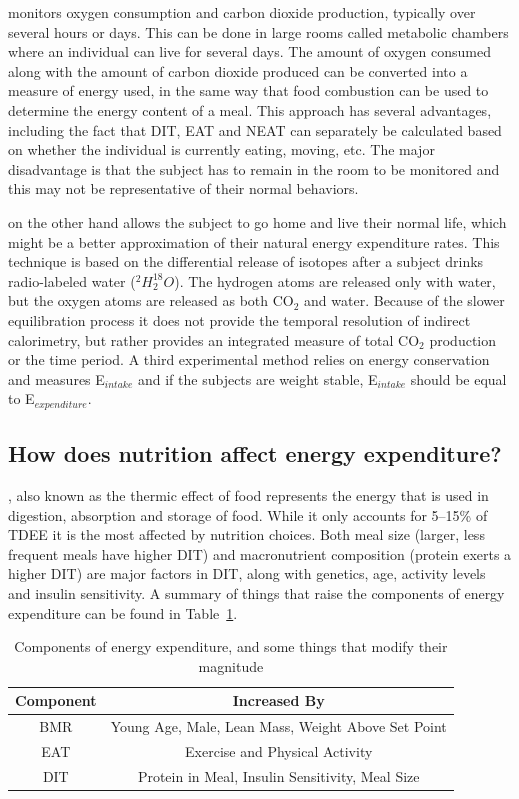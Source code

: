 \documentclass{tufte-handout}
\begin{document}
 monitors oxygen consumption and carbon dioxide production, typically over several hours or days.  This can be done in large rooms called metabolic chambers where an individual can live for several days.  The amount of oxygen consumed along with the amount of carbon dioxide produced can be converted into a measure of energy used, in the same way that food combustion can be used to determine the energy content of a meal.  This approach has several advantages, including the fact that DIT, EAT and NEAT can separately be calculated based on whether the individual is currently eating, moving, etc.  The major disadvantage is that the subject has to remain in the room to be monitored and this may not be representative of their normal behaviors.

 on the other hand allows the subject to go home and live their normal life, which might be a better approximation of their natural energy expenditure rates.  This technique is based on the differential release of isotopes after a subject drinks radio-labeled water ($^2H_2^{18}O$).  The hydrogen atoms are released only with water, but the oxygen atoms are released as both CO$_2$ and water.  Because of the slower equilibration process it does not provide the temporal resolution of indirect calorimetry, but rather provides an integrated measure of total CO$_2$ production or the time period.  A third experimental method relies on energy conservation and measures E$_{intake}$ and if the subjects are weight stable, E$_{intake}$ should be equal to E$_{expenditure}$. 

\subsection{How does nutrition affect energy expenditure?} 

, also known as the thermic effect of food represents the energy that is used in digestion, absorption and storage of food.  While it only accounts for 5--15\% of TDEE it is the most affected by nutrition choices.  Both meal size (larger, less frequent meals have higher DIT) and macronutrient composition (protein exerts a higher DIT) are major factors in DIT, along with genetics, age, activity levels and insulin sensitivity.  A summary of things that raise the components of energy expenditure can be found in Table~\ref{tab:ee-components}.


\begin{table}
\centering
\caption{Components of energy expenditure, and some things that modify their magnitude}\label{tab:ee-components}
\begin{tabular}{cc}
\hline
\textbf{Component} & \textbf{Increased By}  \\
\hline
BMR & Young Age, Male, Lean Mass, Weight Above Set Point\\
EAT & Exercise and Physical Activity\\
DIT & Protein in Meal, Insulin Sensitivity, Meal Size\\
\hline
\end{tabular}
\end{table}
\end{document}
